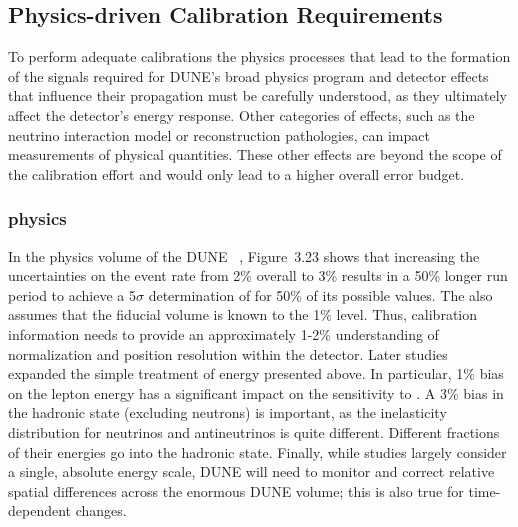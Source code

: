 \subsection{Physics-driven Calibration Requirements}
\label{sec:phys-calib-req}


To perform adequate calibrations the physics processes that lead to the formation of the signals required for DUNE's broad physics program and detector effects that influence their propagation must be carefully understood, as they ultimately affect the detector's energy response. 
Other categories of effects, such as the neutrino interaction model or reconstruction pathologies, can impact measurements of physical quantities. These other effects are beyond the scope of the  calibration effort and would only lead to a higher overall error budget.

\subsubsection{ physics}
\label{sec:phys-calib-lbl}
In the physics volume of the DUNE ~\cite{Acciarri:2015uup}, Figure~3.23 shows that increasing the uncertainties on the \nue event rate from \num{2}\% overall to \num{3}\% results in a \num{50}\% longer run period to achieve a 5$\sigma$ determination of  for 50\% of its possible values. 
The  also assumes that the fiducial volume is known to the 1\% level. Thus, calibration information needs to provide an approximately 1-2\% understanding of normalization 
and position resolution within the detector. Later studies~\cite{ebias} expanded the simple treatment of energy  presented above. In particular, \num{1}\% bias on the lepton energy has a significant impact on the sensitivity to . 
%
A \num{3}\% bias in the hadronic state (excluding neutrons) is important, as the inelasticity  distribution for neutrinos and antineutrinos is quite different.  Different fractions of their energies go into the hadronic state. Finally, while studies largely consider a single, absolute energy scale, DUNE will need to monitor and correct relative spatial differences across the enormous DUNE  volume; this is also true for time-dependent changes. 

